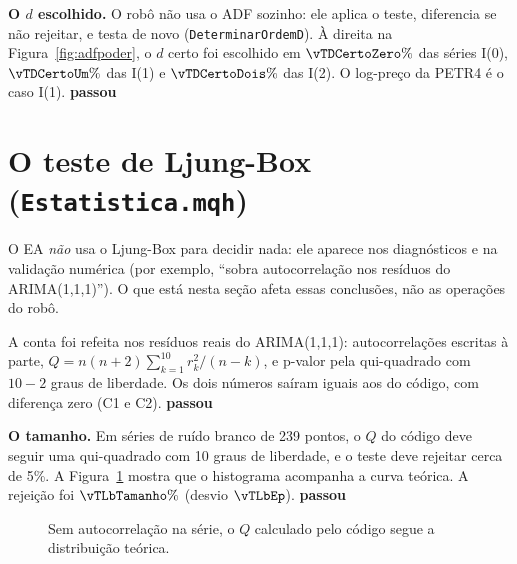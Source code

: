 \documentclass[11pt,a4paper]{article}
\newcommand{\arq}[1]{../../../dados/verificacao/testes_formulas_2026-10-30/#1}
\newcommand{\ok}{\textcolor{cok}{\textbf{passou}}}
\begin{document}
\textbf{O $d$ escolhido.} O robô não usa o ADF sozinho: ele aplica o teste, diferencia se não rejeitar, e testa
de novo (\texttt{DeterminarOrdemD}). À direita na Figura~\ref{fig:adfpoder}, o $d$ certo foi escolhido em
$\vTDCertoZero\%$ das séries I(0), $\vTDCertoUm\%$ das I(1) e $\vTDCertoDois\%$ das I(2). O log-preço da PETR4 é
o caso I(1). \ok

\section{O teste de Ljung-Box (\texttt{Estatistica.mqh})}\label{sec:ljung}

\begin{cuidado}
O EA \emph{não} usa o Ljung-Box para decidir nada: ele aparece nos diagnósticos e na validação numérica (por
exemplo, ``sobra autocorrelação nos resíduos do ARIMA(1,1,1)''). O que está nesta seção afeta essas conclusões,
não as operações do robô.
\end{cuidado}

A conta foi refeita nos resíduos reais do ARIMA(1,1,1): autocorrelações escritas à parte, $Q =
n(n+2)\sum_{k=1}^{10} r_k^2/(n-k)$, e p-valor pela qui-quadrado com $10 - 2$ graus de liberdade. Os dois números
saíram iguais aos do código, com diferença zero (C1 e C2). \ok

\textbf{O tamanho.} Em \vTLbR{} séries de ruído branco de 239 pontos, o $Q$ do código deve seguir uma
qui-quadrado com 10 graus de liberdade, e o teste deve rejeitar cerca de 5\%. A Figura~\ref{fig:lb} mostra que o
histograma acompanha a curva teórica. A rejeição foi $\vTLbTamanho\%$ (desvio $\vTLbEp$). \ok

\begin{figure}[htbp]
\centering
{}
\caption{Sem autocorrelação na série, o $Q$ calculado pelo código segue a distribuição teórica.}
\label{fig:lb}
\end{figure}
\end{document}
